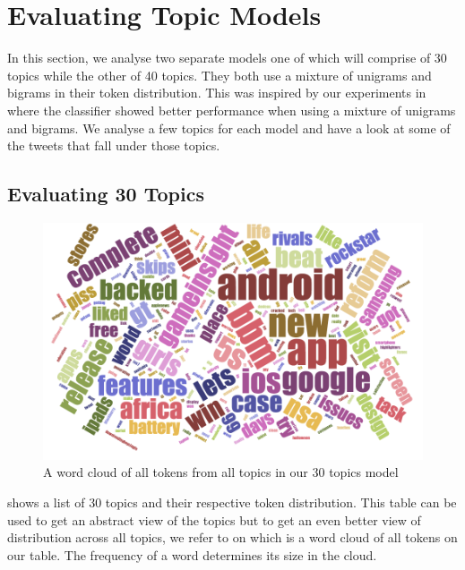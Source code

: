 \section{Evaluating Topic Models}
\label{sec:evaluating-topic-models}
In this section, we analyse two separate models one of which will comprise of 30 topics while the
other of 40 topics. They both use a mixture of unigrams and bigrams in their token distribution.
This was inspired by our experiments in  where the classifier
showed better performance when using a mixture of unigrams and bigrams. We analyse a few topics for
each model and have a look at some of the tweets that fall under those topics.

\subsection{Evaluating 30 Topics}
\label{sec:evaluating-30-topics}
\begin{figure}
\begin{center}
  \includegraphics[scale=0.75,angle=90]{Figures/30_topics_cloud}
\end{center}
\caption{A word cloud of all tokens from all topics in our 30 topics model}
\label{fig:30-topics-cloud}
\end{figure}

 shows a list of 30 topics and their respective token distribution. This
table can be used to get an abstract view of the topics but to get an even better view of
distribution across all topics, we refer to  on
 which is a word cloud of all tokens on our table. The frequency of a
word determines its size in the cloud.

